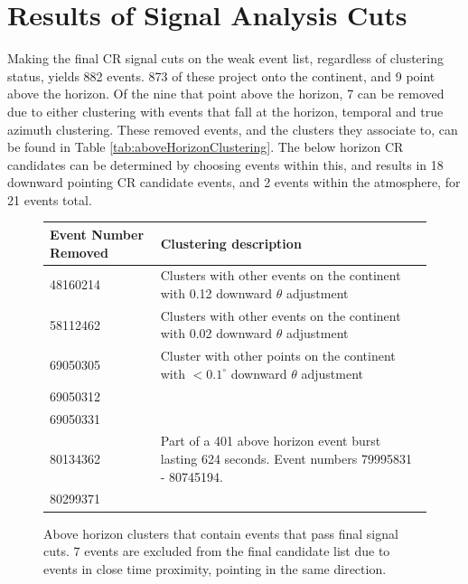 %		

\section{Results of Signal Analysis Cuts}
		Making the final CR signal cuts on the weak event list, regardless of clustering status, yields 882 events.  873 of these project onto the continent, and 9 point above the horizon.  Of the nine that point above the horizon, 7 can be removed due to either clustering with events that fall at the horizon, temporal and true azimuth clustering.  These removed events, and the clusters they associate to, can be found in Table \ref{tab:aboveHorizonClustering}. The below horizon CR candidates can be determined by choosing events within this, and results in 18 downward pointing CR candidate events, and 2 events within the atmosphere, for 21 events total.  
		
	\begin{figure}
		\centering
		\begin{tabular}[c]{|l|p{7cm}|}
		\hline
		Event Number Removed & Clustering description \\
		\hline
		48160214 &  Clusters with other events on the continent with 0.12 downward $\theta$ adjustment \\
		\hline
		58112462 &  Clusters with other events on the continent with 0.02 downward $\theta$ adjustment \\
		\hline
		69050305 &  Cluster with other points on the continent with  $<0.1^\circ$ downward $\theta$ adjustment \\
		69050312 &  \\
		69050331 &  \\
		\hline
		80134362 &  Part of a 401 above horizon event burst lasting 624 seconds. Event numbers 79995831 - 80745194. \\
		80299371 &  \\
		\hline
		\end{tabular}
		\caption{Above horizon clusters that contain events that pass final signal cuts.  7 events are excluded from the final candidate list due to events in close time proximity, pointing in the same direction.}
		\label{tab:aboveHorizonCluster}
	\end{figure}
	
